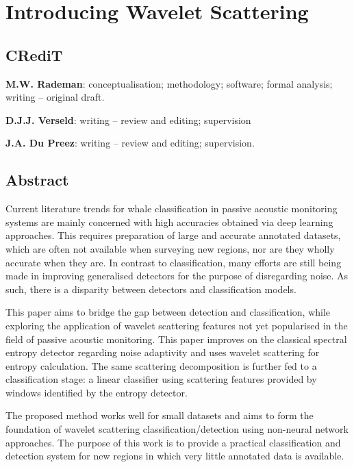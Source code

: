 \chapter{Introducing Wavelet Scattering}
\label{chap:p2}



\section*{CRediT}
\textbf{M.W. Rademan}: conceptualisation; methodology; software; formal analysis; writing -- original draft.

\textbf{D.J.J. Verseld}: writing -- review and editing; supervision

\textbf{J.A. Du Preez}: writing -- review and editing; supervision.

\section*{Abstract}
Current literature trends for whale classification in passive acoustic monitoring systems are mainly concerned with high accuracies obtained via deep learning approaches. This requires preparation of large and accurate annotated datasets, which are often not available when surveying new regions, nor are they wholly accurate when they are. In contrast to classification, many efforts are still being made in improving generalised detectors for the purpose of disregarding noise. As such, there is a disparity between detectors and classification models. 

This paper aims to bridge the gap between detection and classification, while exploring the application of wavelet scattering features not yet popularised in the field of passive acoustic monitoring. This paper improves on the classical spectral entropy detector regarding noise adaptivity and uses wavelet scattering for entropy calculation. The same scattering decomposition is further fed to a classification stage: a linear classifier using scattering features provided by windows identified by the entropy detector.

The proposed method works well for small datasets and aims to form the foundation of wavelet scattering classification/detection using non-neural network approaches. The purpose of this work is to provide a practical classification and detection system for new regions in which very little annotated data is available.  


